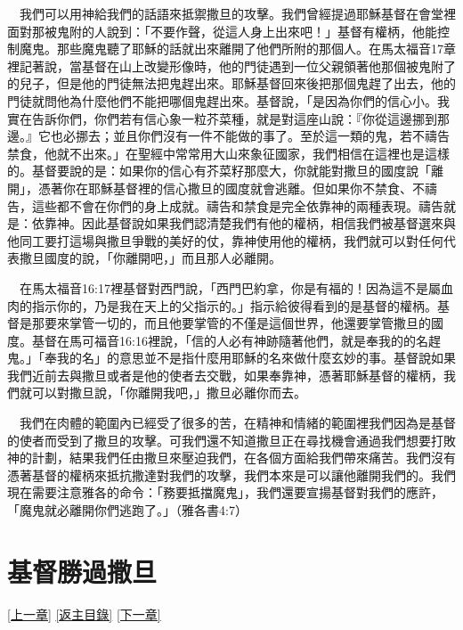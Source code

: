 \documentclass{book}
\begin{document}
　我們可以用神給我們的話語來抵禦撒旦的攻擊。我們曾經提過耶穌基督在會堂裡面對那被鬼附的人說到：「不要作聲，從這人身上出來吧！」基督有權柄，他能控制魔鬼。那些魔鬼聽了耶穌的話就出來離開了他們所附的那個人。在馬太福音17章裡記著說，當基督在山上改變形像時，他的門徒遇到一位父親領著他那個被鬼附了的兒子，但是他的門徒無法把鬼趕出來。耶穌基督回來後把那個鬼趕了出去，他的門徒就問他為什麼他們不能把哪個鬼趕出來。基督說，「是因為你們的信心小。我實在告訴你們，你們若有信心象一粒芥菜種，就是對這座山說：『你從這邊挪到那邊。』它也必挪去；並且你們沒有一件不能做的事了。至於這一類的鬼，若不禱告禁食，他就不出來。」在聖經中常常用大山來象征國家，我們相信在這裡也是這樣的。基督要說的是：如果你的信心有芥菜籽那麼大，你就能對撒旦的國度說「離開」，憑著你在耶穌基督裡的信心撒旦的國度就會逃離。但如果你不禁食、不禱告，這些都不會在你們的身上成就。禱告和禁食是完全依靠神的兩種表現。禱告就是：依靠神。因此基督說如果我們認清楚我們有他的權柄，相信我們被基督選來與他同工要打這場與撒旦爭戰的美好的仗，靠神使用他的權柄，我們就可以對任何代表撒旦國度的說，「你離開吧，」而且那人必離開。

　在馬太福音16:17裡基督對西門說，「西門巴約拿，你是有福的！因為這不是屬血肉的指示你的，乃是我在天上的父指示的。」指示給彼得看到的是基督的權柄。基督是那要來掌管一切的，而且他要掌管的不僅是這個世界，他還要掌管撒旦的國度。基督在馬可福音16:16裡說，「信的人必有神跡隨著他們，就是奉我的的名趕鬼。」「奉我的名」的意思並不是指什麼用耶穌的名來做什麼玄妙的事。基督說如果我們近前去與撒旦或者是他的使者去交戰，如果奉靠神，憑著耶穌基督的權柄，我們就可以對撒旦說，「你離開我吧，」撒旦必離你而去。

　我們在肉體的範圍內已經受了很多的苦，在精神和情緒的範圍裡我們因為是基督的使者而受到了撒旦的攻擊。可我們還不知道撒旦正在尋找機會通過我們想要打敗神的計劃，結果我們任由撒旦來壓迫我們，在各個方面給我們帶來痛苦。我們沒有憑著基督的權柄來抵抗撒達對我們的攻擊，我們本來是可以讓他離開我們的。我們現在需要注意雅各的命令：「務要抵擋魔鬼」，我們還要宣揚基督對我們的應許，「魔鬼就必離開你們逃跑了。」（雅各書4:7）

\chapter{基督勝過撒旦}
\label{sec:ch16}
\hyperref[sec:ch15]{[上一章]}
\hyperlink{toc}{[返主目錄]}
\hyperref[sec:ch17]{[下一章]}

\begin{center}
\noindent{}
\end{center}
\end{document}
